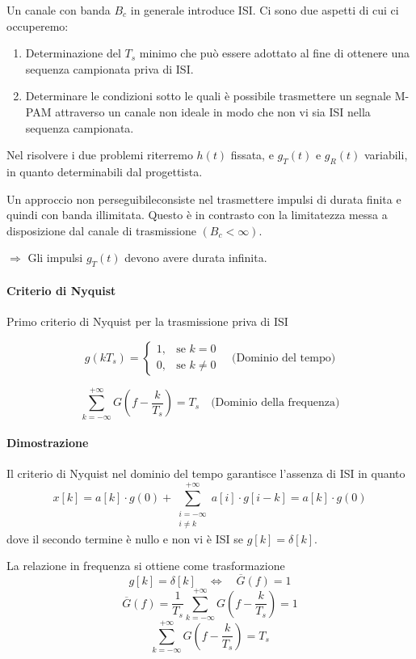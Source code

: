 Un canale con banda \( B_c \) in generale introduce ISI. Ci sono due aspetti di cui ci occuperemo:

\begin{enumerate}
    \item Determinazione del \( T_s \) minimo che può essere adottato al fine di ottenere una sequenza campionata priva di ISI.
    \item Determinare le condizioni sotto le quali è possibile trasmettere un segnale M-PAM attraverso un canale non ideale in modo che non vi sia ISI nella sequenza campionata.
\end{enumerate}

Nel risolvere i due problemi riterremo \( h(t) \) fissata, e \( g_T(t) \) e \( g_R(t) \) variabili, in quanto determinabili dal progettista.

Un approccio non perseguibileconsiste nel trasmettere impulsi di durata finita e quindi con banda illimitata. Questo è in contrasto con la limitatezza messa a disposizione dal canale di trasmissione \( (B_c < \infty) \).

\(\Rightarrow\) Gli impulsi \( g_T(t) \) devono avere durata infinita.

\paragraph*{Criterio di Nyquist}{Primo criterio di Nyquist per la trasmissione priva di ISI}

\[ g(kT_s) =
    \begin{cases}
        1, & \text{se } k=0      \\
        0, & \text{se } k \neq 0
    \end{cases}
    \quad \text{(Dominio del tempo)}
\]

\[ \sum_{k=-\infty}^{+\infty} G\left(f-\frac{k}{T_s}\right) = T_s \quad \text{(Dominio della frequenza)} \]




\paragraph*{Dimostrazione}
Il criterio di Nyquist nel dominio del tempo garantisce l'assenza di ISI in quanto
\[ x[k] = a[k] \cdot g(0) + \sum_{\substack{i=-\infty \\ i \neq k}}^{+\infty} a[i] \cdot g[i-k] = a[k] \cdot g(0) \]
dove il secondo termine è nullo e non vi è ISI se \( g[k] = \delta[k] \).

La relazione in frequenza si ottiene come trasformazione
\[ g[k] = \delta[k] \quad \Longleftrightarrow \quad \overline{G}(f) = 1 \]
\[ \overline{G}(f) = \frac{1}{T_s} \sum_{k=-\infty}^{+\infty} G\left(f - \frac{k}{T_s}\right) = 1 \]
\[ \sum_{k=-\infty}^{+\infty} G\left(f - \frac{k}{T_s}\right) = T_s \]


